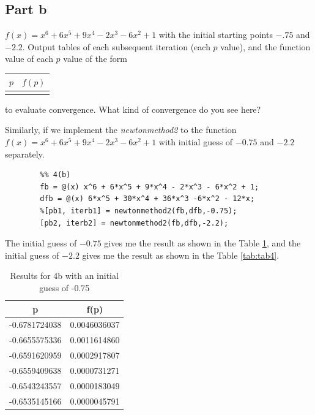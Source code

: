 \subsection{Part b}

\begin{question}
    $f(x) = x^6+6x^5+9x^4-2x^3-6x^2+1$ with the initial starting points $-.75$ and $-2.2$. Output tables of each subsequent iteration (each $p$ value), and the function value of each $p$ value of the form \begin{tabular}{c|c} $p$ & $f(p)$ \\ \hline & \end{tabular} to evaluate convergence. What kind of convergence do you see here? 
\end{question}

\begin{answer}
    Similarly, if we implement the \textit{newtonmethod2} to the function $f(x) = x^6+6x^5+9x^4-2x^3-6x^2 + 1$ with initial guess of $-0.75$ and $-2.2$ separately.
    \begin{verbatim}
        %% 4(b)
        fb = @(x) x^6 + 6*x^5 + 9*x^4 - 2*x^3 - 6*x^2 + 1;
        dfb = @(x) 6*x^5 + 30*x^4 + 36*x^3 -6*x^2 - 12*x;
        %[pb1, iterb1] = newtonmethod2(fb,dfb,-0.75);
        [pb2, iterb2] = newtonmethod2(fb,dfb,-2.2);
    \end{verbatim}
    The initial guess of $-0.75$ gives me the result as shown in the Table \ref{tab:tab3}, and the initial guess of $-2.2$ gives me the result as shown in the Table \ref{tab:tab4}.
    \begin{table}[H]
    \parbox{.45\linewidth}{
    \centering
    \caption{Results for 4b with an initial guess of -0.75}
    \label{tab:tab3}
    \begin{tabular}{c|c}
    \textbf{p}                         & \textbf{f(p)}                    \\ \hline
    -0.6781724038                      & 0.0046036037                     \\ \hline
    -0.6655575336                      & 0.0011614860                     \\ \hline
    -0.6591620959                      & 0.0002917807                     \\ \hline
    -0.6559409638                      & 0.0000731271                     \\ \hline
    -0.6543243557                      & 0.0000183049                     \\ \hline
    \multicolumn{1}{l|}{-0.6535145166} & \multicolumn{1}{l}{0.0000045791} \\ \hline

\end{tabular}}
\end{table}
\end{answer}
